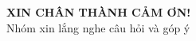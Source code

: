 \documentclass{beamer}
\begin{document}
\thispagestyle{empty}
\begin{frame}[c]
  \begin{center}
    \LARGE{\textbf{XIN CHÂN THÀNH CẢM ƠN!}}\\[1cm]
    \large Nhóm xin lắng nghe câu hỏi và góp ý
  \end{center}
\end{frame}
\end{document}
